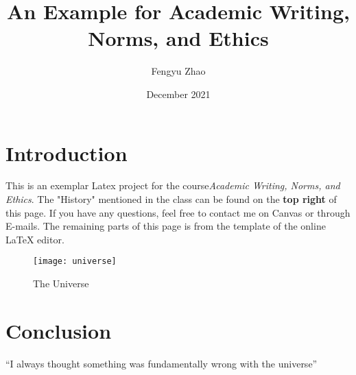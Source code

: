 \documentclass{article}
\title{An Example for Academic Writing, Norms, and Ethics}
\author{Fengyu Zhao}
\date{December 2021}
\begin{document}
\maketitle

\section{Introduction}
This is an exemplar Latex project for the course\emph{Academic Writing, Norms, and Ethics}. The "History" mentioned in the class can be found on the \textbf{top right} of this page. If you have any questions, feel free to contact me on Canvas or through E-mails. The remaining parts of this page is from the template of the online {\LaTeX} editor.

\begin{figure}[h!]
\centering
\texttt{[image: universe]}
\caption{The Universe}
\label{fig:universe}
\end{figure}

\section{Conclusion}
``I always thought something was fundamentally wrong with the universe'' \citep{adams1995hitchhiker}



\end{document}
